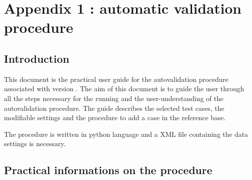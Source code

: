 %
%
%
%
%
%
%
\section{Appendix 1 : automatic validation procedure}
\label{prg_autovalid}
\subsection{Introduction}

This document is the practical user guide for the autovalidation
procedure associated with \CS version \verscs.
The aim of this document is to guide the user through all the steps
necessary for the running and the user-understanding of the autovalidation
procedure.
The guide describes the selected test cases, the modifiable settings
and the procedure to add a case in the reference base.

The procedure is written in python language and a XML file containing the
data settings is necessary.

\subsection{Practical informations on the procedure}

